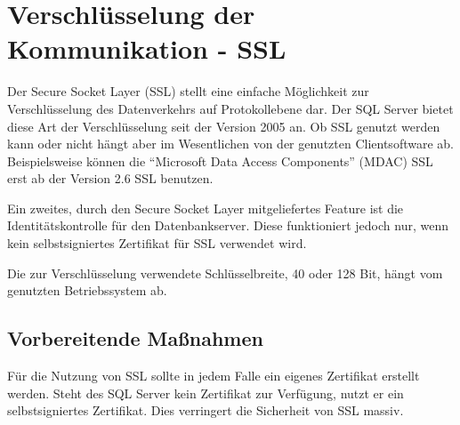     \section{Verschlüsselung der Kommunikation - SSL}
      Der Secure Socket Layer (SSL) stellt eine einfache Möglichkeit zur
      Verschlüsselung des Datenverkehrs auf Protokollebene dar. Der SQL Server
      bietet diese Art der Verschlüsselung seit der Version 2005 an. Ob SSL
      genutzt werden kann oder nicht hängt aber im Wesentlichen von der
      genutzten Clientsoftware ab. Beispielsweise können die \enquote{Microsoft
      Data Access Components} (MDAC) SSL erst ab der Version 2.6 SSL benutzen.
      
      Ein zweites, durch den Secure Socket Layer mitgeliefertes Feature ist die
      Identitätskontrolle für den Datenbankserver. Diese funktioniert jedoch
      nur, wenn kein selbstsigniertes Zertifikat für SSL verwendet wird.
      \begin{merke}
        Die zur Verschlüsselung verwendete Schlüsselbreite, 40 oder 128 Bit,
        hängt vom genutzten Betriebssystem ab.
      \end{merke}
      \subsection{Vorbereitende Maßnahmen}
        \begin{merke}
          Für die Nutzung von SSL sollte in jedem Falle ein eigenes Zertifikat
          erstellt werden. Steht des SQL Server kein Zertifikat zur Verfügung,
          nutzt er ein selbstsigniertes Zertifikat. Dies verringert die
          Sicherheit von SSL massiv.
        \end{merke}
